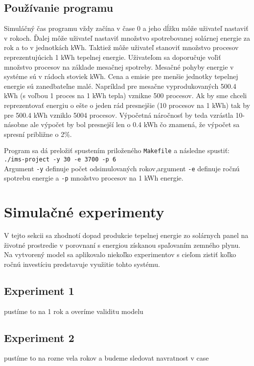 \documentclass[a4paper, 11pt]{article}
\begin{document}
\subsection{Používanie programu}
Simuláčný čas programu vždy začína v čase 0 a jeho dĺžku môže uživateľ nastaviť v rokoch. Ďalej môže uživateľ nastaviť množstvo spotrebovanej solárnej energie za rok a to v jednotkách kWh. Taktiež môže uživateľ stanoviť množstvo procesov reprezentujúcich 1 kWh tepelnej energie. Uživateľom sa doporučuje voľiť množstvo procesov na základe mesačnej spotreby. Mesačné pohyby energie v systéme sú v rádoch stoviek kWh. Cena a emisie pre menšie jednotky tepelnej energie sú zanedbateľne malé. Napríklad pre mesačne vyprodukovaných 500.4 kWh (s voľbou 1 proces na 1 kWh tepla) vznikne 500 procesov. Ak by sme chceli reprezentovať energiu o ešte o jeden rád presnejšie (10 procesov na 1 kWh) tak by pre 500.4 kWh vzniklo 5004 procesov. Výpočetná náročnosť by teda vzrástla 10-násobne ale výpočet by bol presnejší len o 0.4 kWh čo znamená, že výpočet sa spresní približne o 2\%.

Program sa dá preložiť spustením priloženého \texttt{Makefile} a následne spustiť:\\
\texttt{./ims-project -y 30 -e 3700 -p 6} \\
Argument \texttt{-y} definuje počet odsimulovaných rokov,argument \texttt{-e} definuje ročnú spotrebu energie a \texttt{-p} množstvo procesov na 1 kWh energie.

\section{Simulačné experimenty}
V tejto sekcii sa zhodnotí dopad produkcie tepelnej energie zo solárnych panel na životné prostredie v porovnaní s energiou získanou spaľovaním zemného plynu. Na vytvorený model sa aplikovalo niekoľko experimentov s cieľom zistiť koľko ročnú investíciu predstavuje využitie tohto systému.

\subsection{Experiment 1}
pustíme to na 1 rok a overíme validitu  modelu

\subsection{Experiment 2}
pustíme to na rozne vela rokov a budeme sledovat navratnost v case
\end{document}

